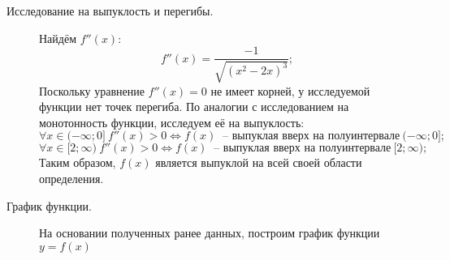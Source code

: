 \documentclass{article}
\begin{document}
\begin{description}
\item[Исследование на выпуклость и перегибы.] Найдём $f''(x)$:
    \begin{equation*}
        f''(x) = \dfrac{-1}{\sqrt{(x^2-2x)^3}};
    \end{equation*}
    Поскольку уравнение $f''(x) = 0$ не имеет корней, у исследуемой функции нет точек перегиба. По аналогии с исследованием на монотонность функции, исследуем её на выпуклость:
    \begin{equation}
        \forall x \in (-\infty;0] ~ f''(x) > 0 \Leftrightarrow f(x) ~ \textrm{ -- выпуклая вверх на полуинтервале} ~ (-\infty;0];
    \end{equation}
    \begin{equation}
        \forall x \in [2;\infty) ~ f''(x) > 0 \Leftrightarrow f(x) ~ \textrm{ -- выпуклая вверх на полуинтервале} ~ [2;\infty);
    \end{equation}
    Таким образом, $f(x)$ является выпуклой на всей своей области определения.
\item[График функции.] На основании полученных ранее данных, построим график функции $y = f(x)$\\
\begin{figure}[h]
\end{figure}
\end{description}


\newpage
\end{document}
